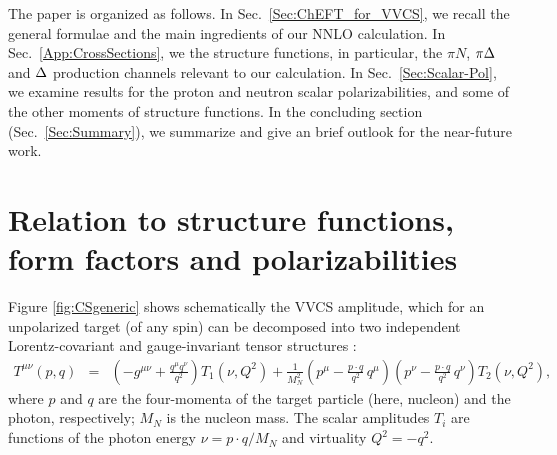 \documentclass[12pt,preprint,tightenlines,
showpacs,preprintnumbers,amsmath,amssymb,
a4paper,nofootinbib]{revtex4-1}
\def\bea{\begin{eqnarray}}
\def\eea{\end{eqnarray}}
\def\eqlab#1{\label{eq:#1}}
\def\seclab#1{\label{sec:#1}}
\begin{document}
The paper is organized as follows. In Sec.~\ref{Sec:ChEFT_for_VVCS}, we recall the general formulae and
the main ingredients of our NNLO calculation. In Sec.~\ref{App:CrossSections}, we the structure functions, in particular, the $\pi N$, $\pi \Delta$ and $\Delta$ production channels  
relevant to our calculation.
In Sec.~\ref{Sec:Scalar-Pol}, we examine results for the proton and neutron scalar polarizabilities, and some of the other moments
of structure functions.  In the concluding section 
(Sec.\ \ref{Sec:Summary}), we summarize and give an brief outlook
for the near-future work. 

















\section{Relation to structure functions, form factors  and polarizabilities} \seclab{LorentzDecomp}

Figure \ref{fig:CSgeneric} shows schematically the VVCS 
amplitude, which for an unpolarized target  (of any spin) can be decomposed into two
independent Lorentz-covariant and gauge-invariant tensor structures
\cite{Hagelstein:2015egb}:
\bea
\label{Eq:T-Rel}
T^{\mu\nu}(p,q) & = &  
\left( -g^{\mu\nu}+\frac{q^{\mu}q^{\nu}}{q^2}\right)
T_1(\nu, Q^2) +\frac{1}{M_N^2} \left(p^{\mu}-\frac{p\cdot
q}{q^2}\,q^{\mu}\right) \left(p^{\nu}-\frac{p\cdot
q}{q^2}\, q^{\nu} \right) T_2(\nu, Q^2),
\eqlab{fVVCS}
\eea
where $p$ and $q$ are the four-momenta of the target particle (here, nucleon)  and the photon, respectively; $M_N$ is the nucleon mass. 
The scalar amplitudes $T_i$ are functions of the photon
energy $\nu = p\cdot q/ M_N$ and virtuality $Q^2=-q^2$.
\end{document}
